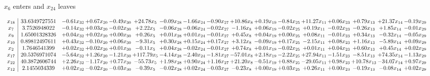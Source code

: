 \documentclass[9pt]{article}
\begin{document}
 $ x_{6} $ enters and $ x_{24} $ leaves 

 \[\begin{array}{c| c c@{\hskip 2pt} c@{\hskip 2pt} c@{\hskip 2pt} c@{\hskip 2pt} c@{\hskip 2pt} c@{\hskip 2pt} c@{\hskip 2pt} c@{\hskip 2pt} c@{\hskip 2pt} c@{\hskip 2pt} c@{\hskip 2pt} c@{\hskip 2pt} c@{\hskip 2pt} c@{\hskip 2pt} c@{\hskip 2pt} }
 x_{18}   &  33.6349727551 & -0.61 x_{32} & +  0.67 x_{20} & -0.49 x_{30} & + 24.78 x_{5} & -0.09 x_{28} & -1.66 x_{24} & -0.90 x_{27} & + 10.86 x_{8} & +  0.19 x_{19} & -0.84 x_{25} & + 11.27 x_{11} & +  0.06 x_{23} & +  0.79 x_{13} & + 21.37 x_{14} & -0.19 x_{29}\\
 x_{7}   &  3.7526948022 & -0.14 x_{32} & +  0.03 x_{20} & -0.02 x_{30} & +  2.22 x_{5} & -0.06 x_{28} & -0.06 x_{24} & -0.02 x_{27} & -1.16 x_{8} & +  0.06 x_{19} & -0.02 x_{25} & +  0.19 x_{11} & -0.02 x_{23} & -0.26 x_{13} & +  1.85 x_{14} & -0.01 x_{29}\\
 x_{9}   &  1.65001328326 & +  0.04 x_{32} & +  0.02 x_{20} & +  0.00 x_{30} & +  0.26 x_{5} & +  0.01 x_{28} & +  0.01 x_{24} & -0.01 x_{27} & +  0.45 x_{8} & +  0.04 x_{19} & +  0.00 x_{25} & +  0.08 x_{11} & -0.01 x_{23} & +  0.34 x_{13} & -0.32 x_{14} & -0.05 x_{29}\\
 x_{10}   &  0.89812497611 & +  0.43 x_{32} & -0.10 x_{20} & +  0.06 x_{30} & -9.31 x_{5} & +  0.30 x_{28} & +  0.15 x_{24} & +  0.17 x_{27} & +  3.12 x_{8} & -0.09 x_{19} & +  0.17 x_{25} & -2.15 x_{11} & +  0.08 x_{23} & +  1.16 x_{13} & -5.89 x_{14} & +  0.09 x_{29}\\
 x_{2}   &  1.7646541399 & +  0.02 x_{32} & +  0.02 x_{20} & +  0.01 x_{30} & -0.11 x_{5} & +  0.04 x_{28} & -0.02 x_{24} & -0.01 x_{27} & +  0.74 x_{8} & +  0.01 x_{19} & -0.02 x_{25} & +  0.01 x_{11} & +  0.04 x_{23} & +  0.60 x_{13} & +  0.45 x_{14} & +  0.02 x_{29}\\
 x_{17}   &  20.5376971074 & -5.64 x_{32} & +  1.26 x_{20} & -1.21 x_{30} & + 117.79 x_{5} & -4.14 x_{28} & -2.40 x_{24} & -1.81 x_{27} & -57.01 x_{8} & +  2.18 x_{19} & -2.22 x_{25} & + 27.94 x_{11} & -1.51 x_{23} & -8.51 x_{13} & + 74.35 x_{14} & -1.13 x_{29}\\
 x_{22}   &  40.3872606744 & +  2.26 x_{32} & -1.17 x_{20} & +  0.77 x_{30} & -55.73 x_{5} & +  1.98 x_{28} & +  0.90 x_{24} & +  1.16 x_{27} & + 21.20 x_{8} & -0.51 x_{19} & +  0.88 x_{25} & -29.05 x_{11} & +  0.98 x_{23} & + 10.78 x_{13} & -34.07 x_{14} & +  0.97 x_{29}\\
 x_{12}   &  2.1455034339 & +  0.02 x_{32} & -0.02 x_{20} & -0.03 x_{30} & -0.39 x_{5} & -0.02 x_{28} & +  0.02 x_{24} & -0.03 x_{27} & -0.23 x_{8} & +  0.00 x_{19} & +  0.03 x_{25} & +  0.26 x_{11} & +  0.00 x_{23} & -0.19 x_{13} & -0.08 x_{14} & +  0.02 x_{29}\\

\end{array}\]
\end{document}
